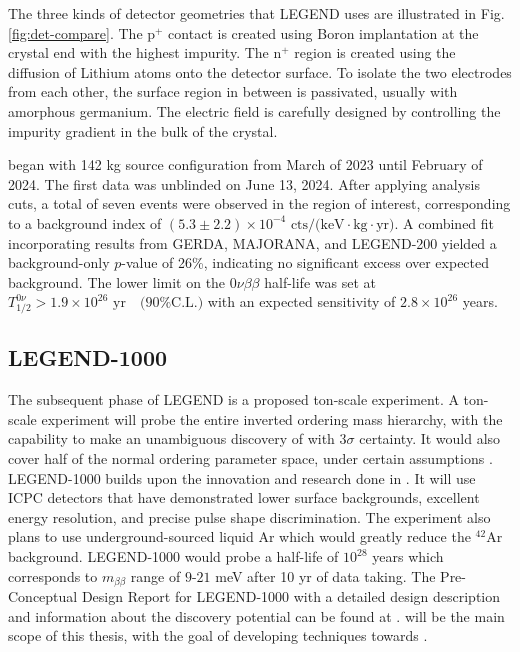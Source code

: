 The three kinds of detector geometries that LEGEND uses are illustrated in Fig. \ref{fig:det-compare}. The p$^+$ contact is created using Boron implantation at the crystal end with the highest impurity. The n$^+$ region is created using the diffusion of Lithium atoms onto the detector surface. To isolate the two electrodes from each other, the surface region in between is passivated, usually with amorphous germanium. The electric field is carefully designed by controlling the impurity gradient in the bulk of the crystal. 


{\Ltwo} began with 142 kg source configuration from March of 2023 until February of 2024. The first data was unblinded on June 13, 2024. After applying analysis cuts, a total of seven events were observed in the region of interest, corresponding to a background index of $ (5.3 \pm 2.2) \times 10^{-4} \text{ cts/(keV$\cdot$kg$\cdot$yr)}$. A combined fit incorporating results from GERDA, MAJORANA, and LEGEND-200 yielded a background-only $p$-value of 26\%, indicating no significant excess over expected background. The lower limit on the 0$\nu\beta\beta$ half-life was set at $T^{0\nu}_{1/2} > 1.9 \times 10^{26} \text{ yr} \quad \text{(90\% C.L.)}$
with an expected sensitivity of $2.8 \times 10^{26}$ years. \cite{Pertoldi2024}

\subsection{LEGEND-1000}
The subsequent phase of LEGEND is a proposed ton-scale experiment. A ton-scale experiment will probe the entire inverted ordering mass hierarchy, with the capability to make an unambiguous discovery of {\onbb} with $3\sigma$ certainty. It would also cover half of the normal ordering parameter space, under certain assumptions \cite{l1000_pcdr}. LEGEND-1000 builds upon the innovation and research done in {\Ltwo}. It will use ICPC detectors that have demonstrated lower surface backgrounds, excellent energy resolution, and precise pulse shape discrimination. The experiment also plans to use underground-sourced liquid Ar which would greatly reduce the $^{42}$Ar background. LEGEND-1000 would probe a half-life of $10^{28}$ years which corresponds to $m_{\beta\beta}$ range of $9$-$21$ meV after 10 yr of data taking. The Pre-Conceptual Design Report for LEGEND-1000 with a detailed design description and information about the discovery potential can be found at \cite{l1000_pcdr}. {\Ltwo} will be the main scope of this thesis, with the goal of developing techniques towards {\Lthou}.


